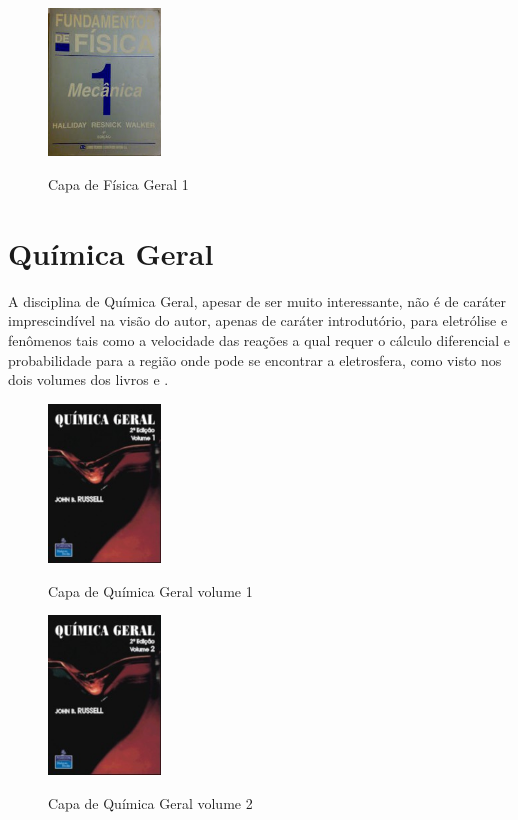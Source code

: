 \documentclass[
	12pt,				%
	openright,			%
	oneside,			%
	a4paper,			%
	english,			%
	french,				%
	spanish,			%
	brazil				%
	]{abntex2}
\begin{document}
\begin{figure}[!htb]
	\caption{Capa de Física Geral 1}
	\centering
	\includegraphics[width=3cm]{halliday1.jpg}
	\label{fig:halliday1}
\end{figure}

\section{Química Geral}\label{sec:qge}
A disciplina de Química Geral, apesar de ser muito interessante, não é de caráter imprescindível na visão do autor, apenas de caráter introdutório, para eletrólise e fenômenos tais como a velocidade das reações a qual requer o cálculo diferencial e probabilidade para a região onde pode se encontrar a eletrosfera, como visto nos dois volumes dos livros  e .

\begin{figure}[!htb]
	\caption{Capa de Química Geral volume 1}
	\centering
	\includegraphics[width=3cm]{russel1.jpg}
	\label{fig:russel1}
\end{figure}
\begin{figure}[!htb]
	\caption{Capa de Química Geral volume 2}
	\centering
	\includegraphics[width=3cm]{russel2.jpg}
	\label{fig:russel2}
\end{figure}
\end{document}
